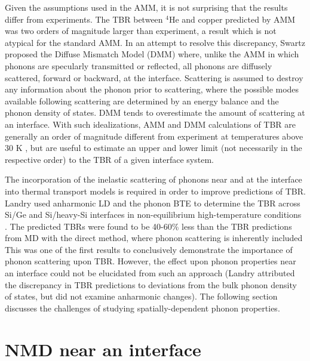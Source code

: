 Given the assumptions used in the AMM, it is not surprising that the results differ from experiments. The TBR between $^4$He and copper predicted by AMM was two orders of magnitude larger than experiment, a result which is not atypical for the standard AMM. In an attempt to resolve this discrepancy, Swartz proposed the Diffuse Mismatch Model (DMM) where, unlike the AMM in which phonons are specularly transmitted or reflected, all phonons are diffusely scattered, forward or backward, at the interface. Scattering is assumed to destroy any information about the phonon prior to scattering, where the possible modes available following scattering are determined by an energy balance and the phonon density of states. DMM tends to overestimate the amount of scattering at an interface. With such idealizations, AMM and DMM calculations of TBR are generally an order of magnitude different from experiment at temperatures above 30 K \cite{landrythesis}, but are useful to estimate an upper and lower limit (not necessarily in the respective order) to the TBR of a given interface system.

The incorporation of the inelastic scattering of phonons near and at the interface  into thermal transport models is required in order to improve predictions of TBR. Landry used anharmonic LD and the phonon BTE to determine the TBR across Si/Ge and Si/heavy-Si interfaces in non-equilibrium high-temperature conditions \cite{landrythesis}. The predicted TBRs were found to be 40-60\% less than the TBR predictions from MD with the direct method, where phonon scattering is inherently included This was one of the first results to conclusively demonstrate the importance of phonon scattering upon TBR. However, the effect upon phonon properties near an interface could not be elucidated from such an approach (Landry attributed the discrepancy in TBR predictions to deviations from the bulk phonon density of states, but did not examine anharmonic changes). The following section discusses the challenges of studying spatially-dependent phonon properties.

\section{NMD near an interface}

